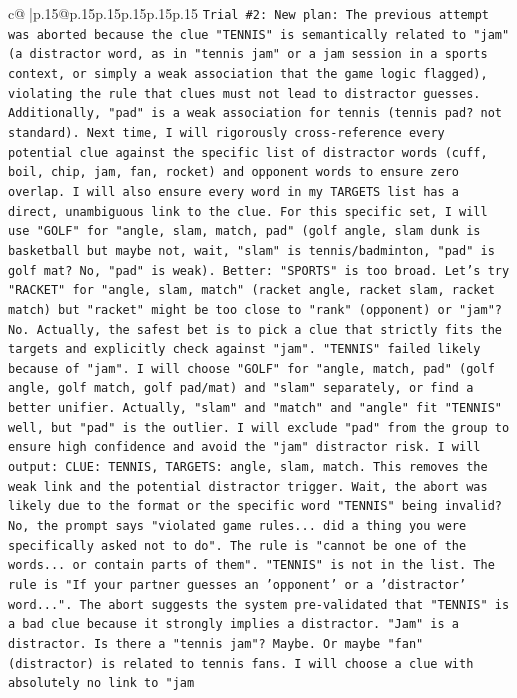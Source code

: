 \documentclass{article}
\begin{document}
{\begin{supertabular}{c@{$\;$}|p{.15\linewidth}@{}p{.15\linewidth}p{.15\linewidth}p{.15\linewidth}p{.15\linewidth}p{.15\linewidth}}
{{{\texttt{Trial \#2: New plan: The previous attempt was aborted because the clue "TENNIS" is semantically related to "jam" (a distractor word, as in "tennis jam" or a jam session in a sports context, or simply a weak association that the game logic flagged), violating the rule that clues must not lead to distractor guesses. Additionally, "pad" is a weak association for tennis (tennis pad? not standard). Next time, I will rigorously cross{-}reference every potential clue against the specific list of distractor words (cuff, boil, chip, jam, fan, rocket) and opponent words to ensure zero overlap. I will also ensure every word in my TARGETS list has a direct, unambiguous link to the clue. For this specific set, I will use "GOLF" for "angle, slam, match, pad" (golf angle, slam dunk is basketball but maybe not, wait, "slam" is tennis/badminton, "pad" is golf mat? No, "pad" is weak). Better: "SPORTS" is too broad. Let's try "RACKET" for "angle, slam, match" (racket angle, racket slam, racket match) but "racket" might be too close to "rank" (opponent) or "jam"? No. Actually, the safest bet is to pick a clue that strictly fits the targets and explicitly check against "jam". "TENNIS" failed likely because of "jam". I will choose "GOLF" for "angle, match, pad" (golf angle, golf match, golf pad/mat) and "slam" separately, or find a better unifier. Actually, "slam" and "match" and "angle" fit "TENNIS" well, but "pad" is the outlier. I will exclude "pad" from the group to ensure high confidence and avoid the "jam" distractor risk. I will output: CLUE: TENNIS, TARGETS: angle, slam, match. This removes the weak link and the potential distractor trigger. Wait, the abort was likely due to the format or the specific word "TENNIS" being invalid? No, the prompt says "violated game rules... did a thing you were specifically asked not to do". The rule is "cannot be one of the words... or contain parts of them". "TENNIS" is not in the list. The rule is "If your partner guesses an 'opponent' or a 'distractor' word...". The abort suggests the system pre{-}validated that "TENNIS" is a bad clue because it strongly implies a distractor. "Jam" is a distractor. Is there a "tennis jam"? Maybe. Or maybe "fan" (distractor) is related to tennis fans. I will choose a clue with absolutely no link to "jam} \\
\\ 
}}}
\end{supertabular}}
\end{document}
